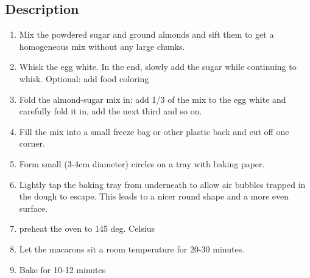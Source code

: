 \subsection{Description}
\begin{enumerate}
	\item Mix the powdered sugar and ground almonds and sift them to get a homogeneous mix without any large chunks.
	\item Whisk the egg white. In the end, slowly add the sugar while continuing to whisk. Optional: add food coloring
	\item Fold the almond-sugar mix in: add 1/3 of the mix to the egg white and carefully fold it in, add the next third and so on.
	\item Fill the mix into a small freeze bag or other plastic back and cut off one corner.
	\item Form small (3-4cm diameter) circles on a tray with baking paper.
	\item Lightly tap the baking tray from underneath to allow air bubbles trapped in the dough to escape. This leads to a nicer round shape and a more even surface.
	\item preheat the oven to 145 deg. Celsius
	\item Let the macarons sit a room temperature for 20-30 minutes.
	\item Bake for 10-12 minutes
\end{enumerate}


